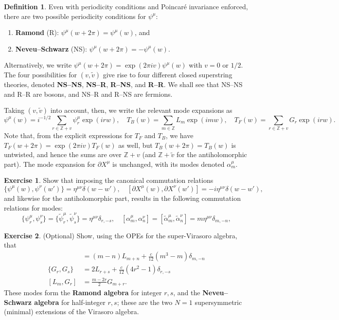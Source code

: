 \documentclass{report}
\theoremstyle{plain}
\theoremstyle{definition}
\newtheorem{definition}[theorem]{Definition}
\newtheorem{exercise}{Exercise}[section]
\theoremstyle{remark}
\newcommand{\di}{\partial}
\newcommand{\bZ}{\mathbb{Z}}
\begin{document}
\begin{definition}
  Even with periodicity conditions and Poincar\'e invariance enforced,
  there are two possible periodicity conditions for $\psi^\mu$:
  \begin{enumerate}
  \item {\bf Ramond} (R): $\psi^\mu(w + 2\pi) = \psi^\mu(w)$, and
  \item {\bf Neveu--Schwarz} (NS): $\psi^\mu(w + 2\pi) = -\psi^\mu(w)$.
  \end{enumerate}
  Alternatively, we write $\psi^\mu(w + 2\pi) = \exp(2\pi i v)
  \psi^\mu(w)$ with $v = 0$ or $1/2$. The four possibilities for $(v,
  \tilde{v})$ give rise to four different closed superstring theories,
  denoted {\bf NS--NS}, {\bf NS--R}, {\bf R--NS}, and {\bf R--R}. We
  shall see that NS--NS and R--R are bosons, and NS--R and R--NS are
  fermions.
\end{definition}

Taking $(v, \tilde{v})$ into account, then, we write the relevant mode
expansions as
\[ \psi^\mu(w) = i^{-1/2} \sum_{r \in \bZ + v} \psi_r^\mu \exp(irw), \quad T_B(w) = \sum_{m \in \bZ} L_m \exp(imw), \quad T_F(w) = \sum_{r \in \bZ + v} G_r \exp(irw). \]
Note that, from the explicit expressions for $T_F$ and $T_B$, we have
$T_F(w + 2\pi) = \exp(2\pi iv) T_F(w)$ as well, but $T_B(w + 2\pi) =
T_B(w)$ is untwisted, and hence the sums are over $\bZ + v$ (and $\bZ
+ \tilde{v}$ for the antiholomorphic part). The mode expansion for
$\di X^\mu$ is unchanged, with its modes denoted $\alpha^\mu_m$.

\begin{exercise}
  Show that imposing the canonical commutation relations
  \[ \{\psi^\mu(w), \psi^\nu(w')\} = \eta^{\mu\nu} \delta(w - w'), \quad [\di X^\mu(w), \di X^\nu(w')] = -i \eta^{\mu\nu} \delta(w - w'), \]
  and likewise for the antiholomorphic part, results in the following
  commutation relations for modes:
  \[ \{\psi^\mu_r, \psi^\nu_s\} = \{\tilde{\psi}^\mu_r, \tilde{\psi}^\nu_s\} = \eta^{\mu\nu} \delta_{r,-s}, \quad [\alpha^\mu_m, \alpha^\nu_n] = [\tilde{\alpha}^\mu_m, \tilde{\alpha}^\nu_n] = m\eta^{\mu\nu} \delta_{m,-n}, \]
\end{exercise}

\begin{exercise} (Optional)
  Show, using the OPEs for the super-Virasoro algebra, that
  \begin{align*}
    [L_m, L_n] &= (m - n) L_{m+n} + \frac{c}{12}(m^3 - m)\delta_{m,-n} \\
    \{G_r, G_s\} &= 2 L_{r+s} + \frac{c}{12} (4r^2 - 1) \delta_{r,-s} \\
    [L_m, G_r] &= \frac{m - 2r}{2} G_{m+r}.
  \end{align*}
  These modes form the {\bf Ramond algebra} for integer $r, s$, and
  the {\bf Neveu--Schwarz algebra} for half-integer $r, s$; these are
  the two $N = 1$ supersymmetric (minimal) extensions of the Virasoro
  algebra.
\end{exercise}
\end{document}
